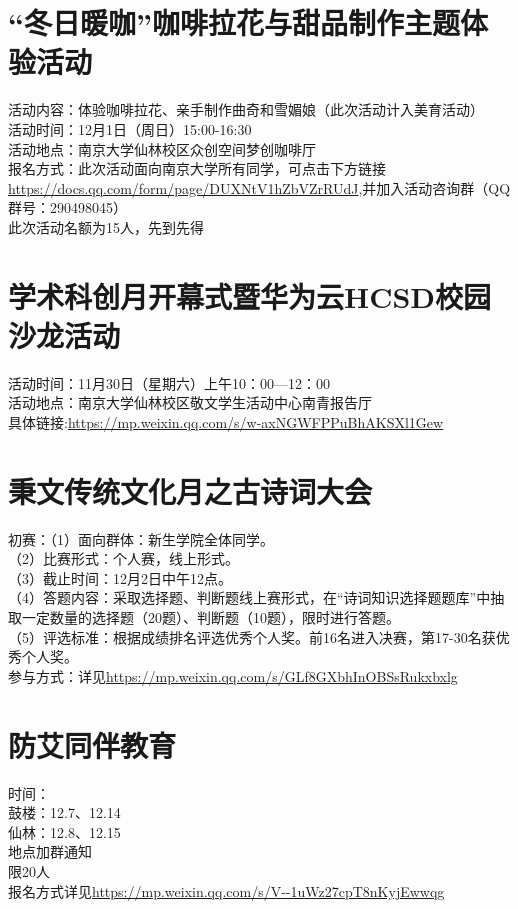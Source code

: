 \documentclass[letterpaper, 12pt]{article}
\begin{document}
\begin{multicols}{2}
\section{“冬日暖咖”咖啡拉花与甜品制作主题体验活动}
活动内容：体验咖啡拉花、亲手制作曲奇和雪媚娘（此次活动计入美育活动）\\
活动时间：12月1日（周日）15:00-16:30\\
活动地点：南京大学仙林校区众创空间梦创咖啡厅\\
报名方式：此次活动面向南京大学所有同学，可点击下方链接\url{https://docs.qq.com/form/page/DUXNtV1hZbVZrRUdJ},并加入活动咨询群（QQ群号：290498045）\\
此次活动名额为15人，先到先得\\
\section{学术科创月开幕式暨华为云HCSD校园沙龙活动}
活动时间：11月30日（星期六）上午10：00—12：00\\
活动地点：南京大学仙林校区敬文学生活动中心南青报告厅\\
具体链接:\url{https://mp.weixin.qq.com/s/w-axNGWFPPuBhAKSXl1Gew}\\
\section{秉文传统文化月之古诗词大会}
初赛：（1）面向群体：新生学院全体同学。\\
（2）比赛形式：个人赛，线上形式。\\
（3）截止时间：12月2日中午12点。\\
（4）答题内容：采取选择题、判断题线上赛形式，在“诗词知识选择题题库”中抽取一定数量的选择题（20题）、判断题（10题），限时进行答题。\\
（5）评选标准：根据成绩排名评选优秀个人奖。前16名进入决赛，第17-30名获优秀个人奖。\\
参与方式：详见\url{https://mp.weixin.qq.com/s/GLf8GXbhInOBSsRukxbxlg}\\
\section{防艾同伴教育}
时间：\\鼓楼：12.7、12.14\\仙林：12.8、12.15\\地点加群通知\\限20人\\报名方式详见\url{https://mp.weixin.qq.com/s/V--1uWz27cpT8nKyjEwwqg}


\end{multicols}
\end{document}
